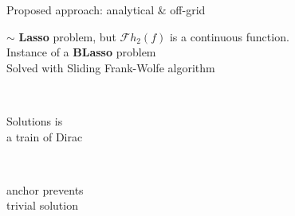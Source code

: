 \begin{frame}{Proposed approach: analytical \& off-grid \hfill\faJediOrder}
        \pause
        \begin{center}
            $\sim$ \textbf{Lasso} problem, but $\mathcal{F}h_2 (f)$ is a continuous function.
            \\Instance of a \textbf{BLasso} problem~\cite{bredies2020sparsity}
            \\Solved with Sliding Frank-Wolfe algorithm \cite{denoyelle2019sliding}
        \end{center}

        \begin{center}
            \textcolor{mygreen}{ \qquad
            \cmark \, \parbox{8.5em}{Solutions is \\ a train of Dirac} \qquad
            \cmark \, \parbox{8em}{anchor prevents \\ trivial solution}}
        \end{center}

\end{frame}

